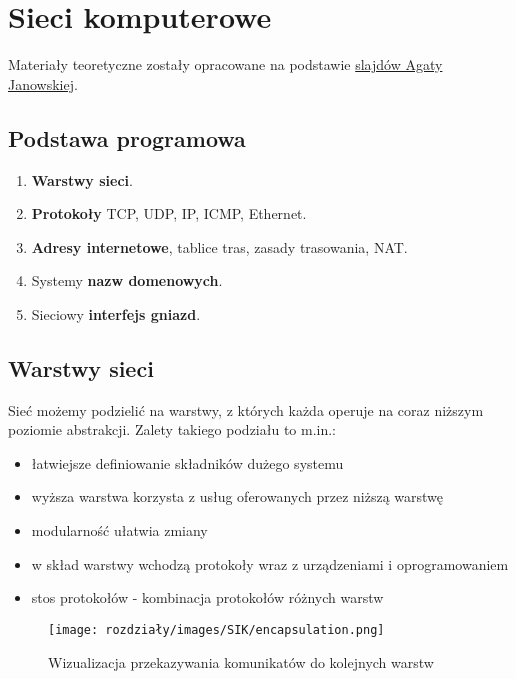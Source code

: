 \chapter{Sieci komputerowe}

Materiały teoretyczne zostały opracowane na podstawie \href{https://moodle.mimuw.edu.pl/course/view.php?id=1351}{slajdów Agaty Janowskiej}.

\section*{Podstawa programowa}
\begin{enumerate}
    \item \textbf{Warstwy sieci}.
    \item \textbf{Protokoły} TCP, UDP, IP, ICMP, Ethernet.
    \item \textbf{Adresy internetowe}, tablice tras, zasady trasowania, NAT.
    \item Systemy \textbf{nazw domenowych}.
    \item Sieciowy \textbf{interfejs gniazd}.
\end{enumerate}

\section{Warstwy sieci}
Sieć możemy podzielić na warstwy, z których każda operuje na coraz niższym poziomie abstrakcji. Zalety takiego podziału to m.in.:
\begin{itemize}
    \item łatwiejsze definiowanie składników dużego systemu
    \item wyższa warstwa korzysta z usług oferowanych przez niższą warstwę
    \item modularność ułatwia zmiany
    \item w skład warstwy wchodzą protokoły wraz z urządzeniami i oprogramowaniem
    \item stos protokołów - kombinacja protokołów różnych warstw
\end{itemize}

\begin{figure}[H]
    \centering
    \texttt{[image: rozdziały/images/SIK/encapsulation.png]}
    \caption{Wizualizacja przekazywania komunikatów do kolejnych warstw}
\end{figure}


